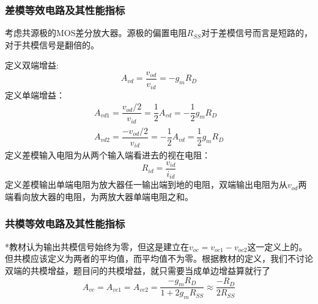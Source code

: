 \documentclass{ctexart}
\begin{document}
\subsubsection{差模等效电路及其性能指标}
考虑共源极的MOS差分放大器。源极的偏置电阻$R_{SS}$对于差模信号而言是短路的，对于共模信号是翻倍的。

定义双端增益:
\begin{equation}
    A_{vd}=\dfrac{v_{od}}{v_{id}}=-g_mR_D
\end{equation}
定义单端增益：
\begin{align}
    A_{vd1}=\dfrac{v_{od}/2}{v_{id}}=\dfrac{1}{2}A_{vd}=-\dfrac{1}{2}g_mR_D\\
    A_{vd2}=\dfrac{-v_{od}/2}{v_{id}}=-\dfrac{1}{2}A_{vd}=\dfrac{1}{2}g_mR_D
\end{align}
{\color{red}{注意：计算单端增益时，输出差模电压取了一半，但是输入的差模信号没变，所以值为双端的一半}}
定义差模输入电阻为从两个输入端看进去的视在电阻：
\begin{equation}
    R_{id}=\dfrac{v_{id}}{i_{id}}
\end{equation}
定义差模输出单端电阻为放大器任一输出端到地的电阻，双端输出电阻为从$v_{od}$两端看向放大器的电阻，为两放大器单端电阻之和。
{\color{blue}{如果电路两边完全对称，则可以采用半电路分析法：把差模输入看作只加在一半电路上，计算出来的增益就是全电路的差模增益。计算输出与输入电阻时，单端加倍即为双端的结果。}}

{}
\subsubsection{共模等效电路及其性能指标}
*教材认为输出共模信号始终为零，但这是建立在$v_{oc}=v_{oc1}-v_{oc2}$这一定义上的。但共模应该定义为两者的平均值，而平均值不为零。根据教材的定义，我们不讨论双端的共模增益，题目问的共模增益，就只需要当成单边增益算就行了
\begin{equation}
    A_{vc}=A_{vc1}=A_{vc2}=\dfrac{-g_mR_D}{1+2g_mR_{SS}}\approx\dfrac{-R_D}{2R_{SS}}
\end{equation}
\end{document}
